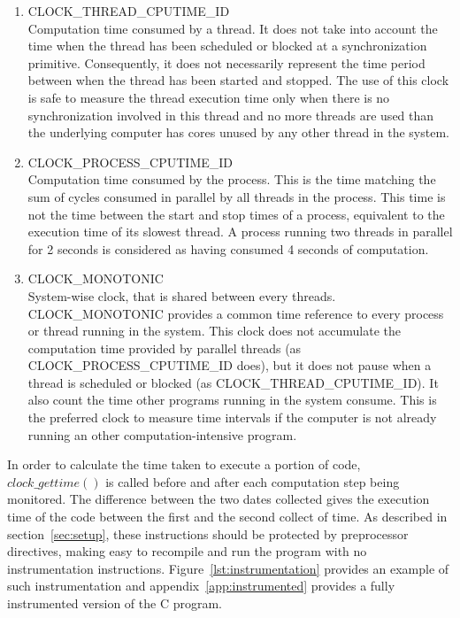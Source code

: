 \begin{enumerate}
\item CLOCK\_THREAD\_CPUTIME\_ID\\
Computation time consumed by a thread. It does not take into account the time when the thread has been scheduled or blocked at a synchronization primitive. Consequently, it does not necessarily represent the time period between when the thread has been started and stopped. The use of this clock is safe to measure the thread execution time only when there is no synchronization involved in this thread and no more threads are used than the underlying computer has cores unused by any other thread in the system.
\item CLOCK\_PROCESS\_CPUTIME\_ID\\
Computation time consumed by the process. This is the time matching the sum of cycles consumed in parallel by all threads in the process. This time is not the time between the start and stop times of a process, equivalent to the execution time of its slowest thread. A process running two threads in parallel for 2 seconds is considered as having consumed 4 seconds of computation.
\item CLOCK\_MONOTONIC\\
System-wise clock, that is shared between every threads. CLOCK\_MONOTONIC provides a common time reference to every process or thread running in the system. This clock does not accumulate the computation time provided by parallel threads (as CLOCK\_PROCESS\_CPUTIME\_ID does), but it does not pause when a thread is scheduled or blocked (as CLOCK\_THREAD\_CPUTIME\_ID). It also count the time other programs running in the system consume. This is the preferred clock to measure time intervals if the computer is not already running an other computation-intensive program.
\end{enumerate}

In order to calculate the time taken to execute a portion of code, $clock\_gettime()$ is called before and after each computation step being monitored. The difference between the two dates collected gives the execution time of the code between the first and the second collect of time. As described in section~\ref{sec:setup}, these instructions should be protected by preprocessor directives, making easy to recompile and run the program with no instrumentation instructions. Figure~\ref{lst:instrumentation} provides an example of such instrumentation and appendix~\ref{app:instrumented} provides a fully instrumented version of the {C} program.

